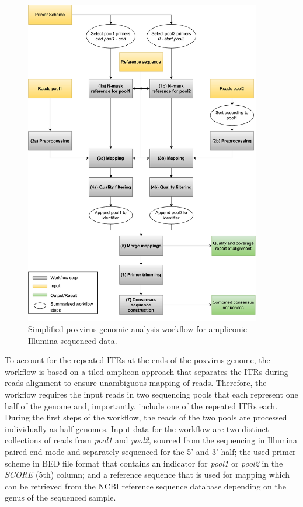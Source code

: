 \begin{figure}[ht!]
	\includegraphics[width=0.92\textwidth]{media/3-pox.pdf}
	\caption{Simplified poxvirus genomic analysis workflow for ampliconic Illumina-sequenced data.}
	\label{fig:3-pox-wf}
\end{figure}

To account for the repeated \acp{ITR} at the ends of the poxvirus genome, the workflow is based on a tiled amplicon approach that separates the \acp{ITR} during reads alignment to ensure unambiguous mapping of reads. Therefore, the workflow requires the input reads in two sequencing pools that each represent one half of the genome and, importantly, include one of the repeated \acp{ITR} each. During the first steps of the workflow, the reads of the two pools are processed individually as half genomes. Input data for the workflow are two distinct collections of reads from \textit{pool1} and \textit{pool2}, sourced from the sequencing in Illumina paired-end mode and separately sequenced for the 5' and 3' half; the used primer scheme in \ac{BED} file format that contains an indicator for \textit{pool1} or \textit{pool2} in the \textit{SCORE} (5th) column; and a reference sequence that is used for mapping which can be retrieved from the \ac{NCBI} reference sequence database depending on the genus of the sequenced sample. \\

